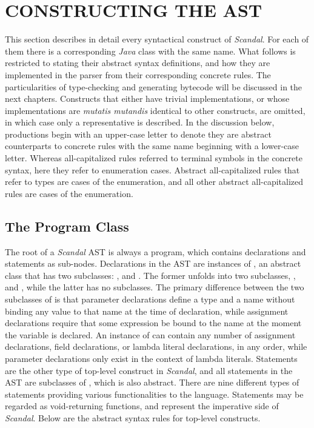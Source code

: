 \chapter{CONSTRUCTING THE AST}

This section describes in detail every syntactical construct of \emph{Scandal}. For each of them there is a corresponding \emph{Java} class with the same name. What follows is restricted to stating their abstract syntax definitions, and how they are implemented in the parser from their corresponding concrete rules. The particularities of type-checking and generating bytecode will be discussed in the next chapters. Constructs that either have trivial implementations, or whose implementations are \emph{mutatis mutandis} identical to other constructs, are omitted, in which case only a representative is described. In the discussion below, productions begin with an upper-case letter to denote they are abstract counterparts to concrete rules with the same name beginning with a lower-case letter. Whereas all-capitalized rules referred to terminal symbols in the concrete syntax, here they refer to enumeration cases. Abstract all-capitalized rules that refer to types are cases of the  enumeration, and all other abstract all-capitalized rules are cases of the  enumeration.

\section{The Program Class}

The root of a \emph{Scandal} AST is always a program, which contains declarations and statements as sub-nodes. Declarations in the AST are instances of , an abstract class that has two subclasses: , and . The former unfolds into two subclasses, , and , while the latter has no subclasses. The primary difference between the two subclasses of  is that parameter declarations define a type and a name without binding any value to that name at the time of declaration, while assignment declarations require that some expression be bound to the name at the moment the variable is declared. An instance of  can contain any number of assignment declarations, field declarations, or lambda literal declarations, in any order, while parameter declarations only exist in the context of lambda literals. Statements are the other type of top-level construct in \emph{Scandal}, and all statements in the AST are subclasses of , which is also abstract. There are nine different types of statements providing various functionalities to the language. Statements may be regarded as void-returning functions, and represent the imperative side of \emph{Scandal}. Below are the abstract syntax rules for top-level constructs.

